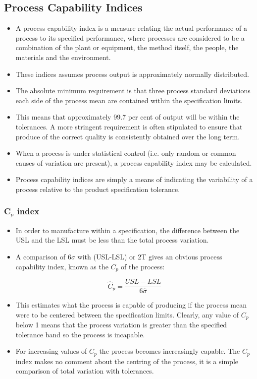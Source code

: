 \documentclass[11pt]{article} %
\begin{document}
	\subsection{Process Capability Indices}
\begin{itemize}
\item A process capability index is a measure relating the actual performance of a process to its specified performance, where processes are considered to be a combination of the plant or equipment, the method itself, the people, the materials and the environment. 
\item 	These indices assumes process output is approximately normally distributed.
\item 	
	The absolute minimum requirement is that three process standard deviations each side of the process mean are contained within the specification limits. 
	\item This means that approximately 99.7 per cent of output will be within the tolerances. A more stringent requirement is often stipulated to ensure that produce of the correct quality is consistently obtained over the long term.
	
\item 	When a process is under statistical control (i.e. only random or common
	causes of variation are present), a process capability index may be calculated. 
\item Process capability indices are simply a means of indicating the variability of a process relative to the product specification tolerance.
\end{itemize}	
\newpage


	
	\subsubsection*{C$_p$ index}
\begin{itemize}
\item	In order to manufacture within a specification, the difference between the
	USL and the LSL must be less than the total process variation.
	
\item A comparison of $6\sigma$ with (USL-LSL) or 2T gives an obvious process capability index, known as the $C_p$ of the process:
	
	
	\[\hat{C}_p = \frac{USL - LSL} {6 \hat{\sigma}}\]	
\item This estimates what the process is capable of producing if the process mean were to be centered between the specification limits. 
	Clearly, any value of $C_p$ below 1 means that the process variation is greater than the specified tolerance band so the process is incapable. 
	
\item For increasing values of $C_p$ the process becomes increasingly capable. The $C_p$ index makes no comment about the centring of the process, it is a simple comparison of total variation with tolerances.
\end{itemize}	
\end{document}
